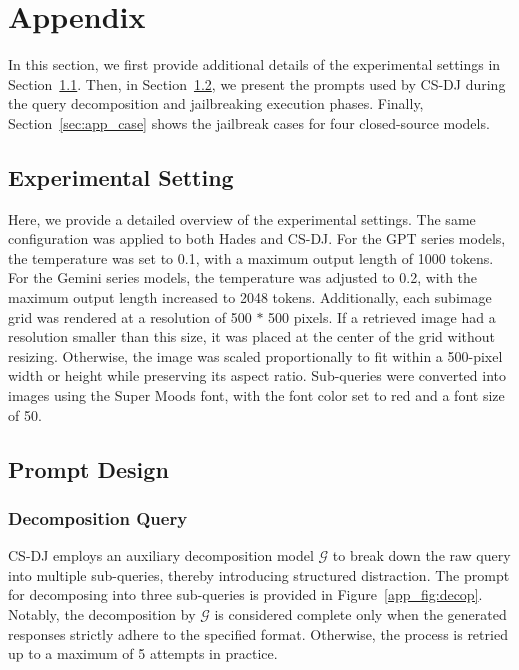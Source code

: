 \section{Appendix}

In this section, we first provide additional details of the experimental settings in Section~\ref{sec:app_exp}. Then, in Section~\ref{sec:app_prompt}, we present the prompts used by CS-DJ during the query decomposition and jailbreaking execution phases. Finally, Section~\ref{sec:app_case} shows the jailbreak cases for four closed-source models.

\subsection{Experimental Setting}
\label{sec:app_exp}


Here, we provide a detailed overview of the experimental settings. The same configuration was applied to both Hades and CS-DJ. For the GPT series models, the temperature was set to 0.1, with a maximum output length of 1000 tokens. For the Gemini series models, the temperature was adjusted to 0.2, with the maximum output length increased to 2048 tokens.
Additionally, each subimage grid was rendered at a resolution of 500 $\ast$ 500 pixels. If a retrieved image had a resolution smaller than this size, it was placed at the center of the grid without resizing. Otherwise, the image was scaled proportionally to fit within a 500-pixel width or height while preserving its aspect ratio. Sub-queries were converted into images using the Super Moods font, with the font color set to red and a font size of 50.


\subsection{Prompt Design}
\label{sec:app_prompt}
\subsubsection{Decomposition Query}


CS-DJ employs an auxiliary decomposition model $\mathcal{G}$ to break down the raw query into multiple sub-queries, thereby introducing structured distraction. The prompt for decomposing into three sub-queries is provided in Figure~\ref{app_fig:decop}. Notably, the decomposition by $\mathcal{G}$ is considered complete only when the generated responses strictly adhere to the specified format. Otherwise, the process is retried up to a maximum of 5 attempts in practice.

